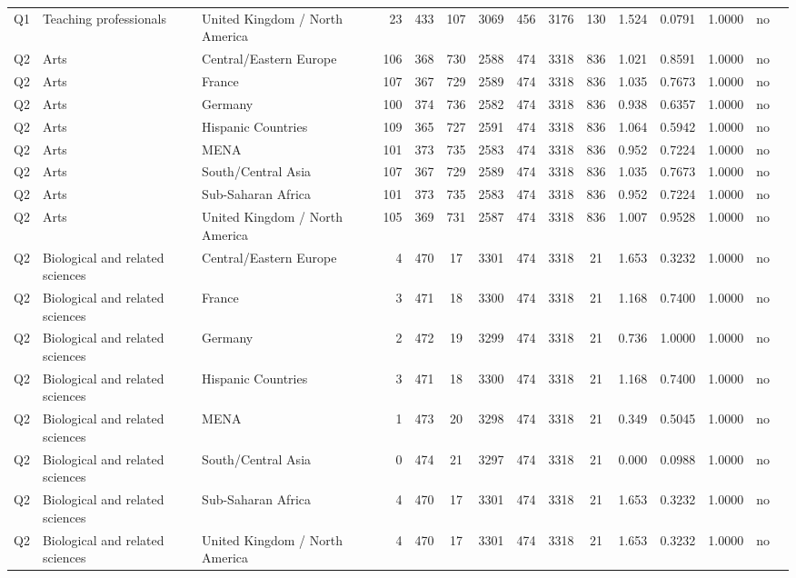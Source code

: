 \begin{longtable}{lllrcccccccccll}
Q1 & Teaching professionals & United Kingdom / North America & 23 & 433 & 107 & 3069 & 456 & 3176 & 130 & 1.524 & 0.0791 & 1.0000 & no \\
Q2 & Arts & Central/Eastern Europe & 106 & 368 & 730 & 2588 & 474 & 3318 & 836 & 1.021 & 0.8591 & 1.0000 & no \\
Q2 & Arts & France & 107 & 367 & 729 & 2589 & 474 & 3318 & 836 & 1.035 & 0.7673 & 1.0000 & no \\
Q2 & Arts & Germany & 100 & 374 & 736 & 2582 & 474 & 3318 & 836 & 0.938 & 0.6357 & 1.0000 & no \\
Q2 & Arts & Hispanic Countries & 109 & 365 & 727 & 2591 & 474 & 3318 & 836 & 1.064 & 0.5942 & 1.0000 & no \\
Q2 & Arts & MENA & 101 & 373 & 735 & 2583 & 474 & 3318 & 836 & 0.952 & 0.7224 & 1.0000 & no \\
Q2 & Arts & South/Central Asia & 107 & 367 & 729 & 2589 & 474 & 3318 & 836 & 1.035 & 0.7673 & 1.0000 & no \\
Q2 & Arts & Sub-Saharan Africa & 101 & 373 & 735 & 2583 & 474 & 3318 & 836 & 0.952 & 0.7224 & 1.0000 & no \\
Q2 & Arts & United Kingdom / North America & 105 & 369 & 731 & 2587 & 474 & 3318 & 836 & 1.007 & 0.9528 & 1.0000 & no \\
Q2 & Biological and related sciences & Central/Eastern Europe & 4 & 470 & 17 & 3301 & 474 & 3318 & 21 & 1.653 & 0.3232 & 1.0000 & no \\
Q2 & Biological and related sciences & France & 3 & 471 & 18 & 3300 & 474 & 3318 & 21 & 1.168 & 0.7400 & 1.0000 & no \\
Q2 & Biological and related sciences & Germany & 2 & 472 & 19 & 3299 & 474 & 3318 & 21 & 0.736 & 1.0000 & 1.0000 & no \\
Q2 & Biological and related sciences & Hispanic Countries & 3 & 471 & 18 & 3300 & 474 & 3318 & 21 & 1.168 & 0.7400 & 1.0000 & no \\
Q2 & Biological and related sciences & MENA & 1 & 473 & 20 & 3298 & 474 & 3318 & 21 & 0.349 & 0.5045 & 1.0000 & no \\
Q2 & Biological and related sciences & South/Central Asia & 0 & 474 & 21 & 3297 & 474 & 3318 & 21 & 0.000 & 0.0988 & 1.0000 & no \\
Q2 & Biological and related sciences & Sub-Saharan Africa & 4 & 470 & 17 & 3301 & 474 & 3318 & 21 & 1.653 & 0.3232 & 1.0000 & no \\
Q2 & Biological and related sciences & United Kingdom / North America & 4 & 470 & 17 & 3301 & 474 & 3318 & 21 & 1.653 & 0.3232 & 1.0000 & no \\

\end{longtable}
